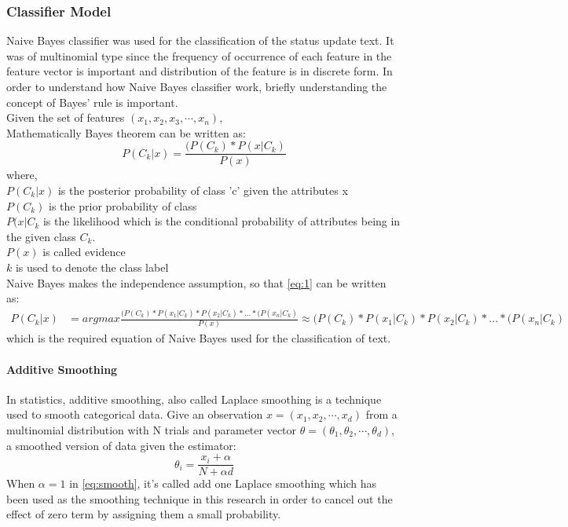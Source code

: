 \documentclass[journal]{IEEEtran}
\begin{document}
\subsubsection{Classifier Model}
Naive Bayes classifier was used for the classification of the status update text. It was of multinomial type since the frequency of occurrence of each feature in the feature vector is important and distribution of the feature is in discrete form.
In order to understand how Naive Bayes classifier \cite{naive} work, briefly understanding the concept of Bayes' rule is important.\\
Given the set of features $(x_1,x_2,x_3,\cdots, x_n)$, \\
Mathematically Bayes theorem can be written as:\\
\begin{equation}\label{eq:1}
P(C_{k}|x) = \frac{(P(C_{k}) * P(x|C_{k})} { P(x)}
\end{equation}
where,\\
$P(C_{k} |x)$ is the posterior probability of class 'c' given the attributes x \\
$P(C_{k})$ is the prior probability of class \\
$P(x|C_{k}$ is the likelihood which is the conditional probability of attributes being in the given class $C_k$.\\
$P(x)$ is called evidence \\
$k$ is used to denote the class label \\
Naive Bayes makes the independence assumption, so that \ref{eq:1} can be written as:\\
\begin{equation}\label{eq:naive}
\begin{aligned}

P(C_{k}|x) 
 & = argmax \frac{(P(C_{k}) * P(x_1|C_{k}) * P(x_2|C_{k})*...* (P(x_n|C_{k})} { P(x)}
 \approx  (P(C_{k}) * P(x_1|C_{k}) * P(x_2|C_{k})*...* (P(x_n|C_{k})

\end{aligned}

\end{equation}
which is the required equation of Naive Bayes used for the classification of text.

\paragraph{Additive Smoothing}

In statistics, additive smoothing, also called Laplace smoothing is a technique used to smooth categorical data. Give an observation $x = (x_1,x_2,\cdots,x_d)$ from a multinomial distribution with N trials and parameter vector $\theta = (\theta_1,\theta_2,\cdots,\theta_d)$, a smoothed version of data given the estimator:\\
\begin{equation}\label{eq:smooth}
  \theta_i = \frac{x_i + \alpha}{N+ \alpha d}
\end{equation}
When $\alpha = 1 $ in \ref{eq:smooth}, it's called add one Laplace smoothing which has been used as the smoothing technique in this research in order to cancel out the effect of zero term by assigning them a small probability.
\end{document}
